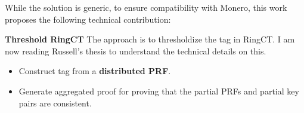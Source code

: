 

While the solution is generic, to ensure compatibility with Monero, this work proposes the following technical contribution:

\medskip

\noindent \textbf{{Threshold RingCT}} The approach is to thresholdize the tag in RingCT. I am now reading Russell's thesis to understand the technical details on this.
\begin{itemize}
    \item Construct tag from a \textbf{distributed PRF}.
    \item Generate aggregated proof for proving that the partial PRFs and partial key pairs are consistent.
   \end{itemize}

